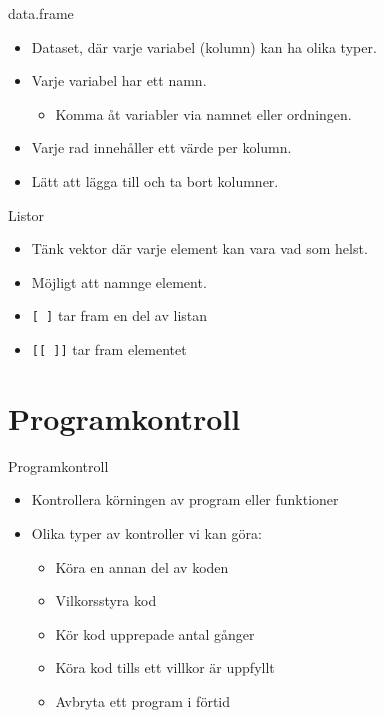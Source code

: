 \documentclass[
  11pt,
  ignorenonframetext,
]{beamer}
\providecommand{\tightlist}{%
  \setlength{\itemsep}{0pt}\setlength{\parskip}{0pt}}
\begin{document}
\begin{frame}{data.frame}
\protect\hypertarget{data.frame}{}
\begin{itemize}
\tightlist
\item
  Dataset, där varje variabel (kolumn) kan ha olika typer.
\item
  Varje variabel har ett namn.

  \begin{itemize}
  \tightlist
  \item
    Komma åt variabler via namnet eller ordningen.
  \end{itemize}
\item
  Varje rad innehåller ett värde per kolumn.
\item
  Lätt att lägga till och ta bort kolumner.
\end{itemize}
\end{frame}

\begin{frame}{Listor}
\protect\hypertarget{listor}{}
\begin{itemize}
\tightlist
\item
  Tänk vektor där varje element kan vara vad som helst.
\item
  Möjligt att namnge element.
\item
  \texttt{[ ]} tar fram en del av listan
\item
  \texttt{[[ ]]} tar fram elementet
\end{itemize}
\end{frame}

\hypertarget{programkontroll}{%
\section{Programkontroll}\label{programkontroll}}

\begin{frame}{Programkontroll}
\protect\hypertarget{programkontroll-1}{}
\begin{itemize}
\tightlist
\item
  Kontrollera körningen av program eller funktioner
\item
  Olika typer av kontroller vi kan göra:

  \begin{itemize}
  \tightlist
  \item
    Köra en annan del av koden
  \item
    Vilkorsstyra kod
  \item
    Kör kod upprepade antal gånger
  \item
    Köra kod tills ett villkor är uppfyllt
  \item
    Avbryta ett program i förtid
  \end{itemize}
\end{itemize}
\end{frame}
\end{document}
